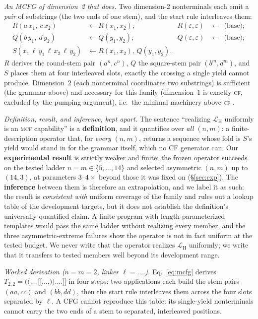 \documentclass[11pt]{article}
\newcommand{\CF}{\textsc{cf}}
\newcommand{\MCF}{\textsc{mcf}}
\begin{document}
\smallskip\noindent\emph{An MCFG of dimension~2 that does.} Two dimension-2 nonterminals each emit a
\emph{pair} of substrings (the two ends of one stem), and the start rule interleaves them:
\begin{align}\label{eq:mcfg}
  R(a\,x_1,\ c\,x_2) &\leftarrow R(x_1,x_2); &  R(\varepsilon,\varepsilon) &\leftarrow \ \ \text{(base)};
  \nonumber\\
  Q(b\,y_1,\ d\,y_2) &\leftarrow Q(y_1,y_2); &  Q(\varepsilon,\varepsilon) &\leftarrow \ \ \text{(base)};\\
  S(x_1\,\ell\,y_1\,\ell\,x_2\,\ell\,y_2) &\leftarrow R(x_1,x_2),\,Q(y_1,y_2). && \nonumber
\end{align}
$R$ derives the round-stem pair $(a^n,c^n)$, $Q$ the square-stem pair $(b^m,d^m)$, and $S$ places them at four
interleaved slots, exactly the crossing a single yield cannot produce. Dimension~$2$ (each nonterminal
coordinates two substrings) is sufficient (the grammar above) and necessary for this family (dimension~$1$ is
exactly \CF, excluded by the pumping argument), i.e.\ the minimal machinery above
\CF{} \citep{seki1991mcfg,katosekikasami2006}.

\smallskip\noindent\emph{Definition, result, and inference, kept apart.} The sentence ``realizing
$\mathcal L_{\mathrm H}$ uniformly is an \MCF{} capability'' is a \textbf{definition}, and it quantifies over
\emph{all} $(n,m)$: a finite-description operator that, for \emph{every} $(n,m)$, returns a sequence whose fold
is $S$'s yield would stand in for the grammar itself, which no CF generator can. Our \textbf{experimental
result} is strictly weaker and finite: the frozen operator succeeds on the tested ladder
$n{=}m\in\{5,\dots,14\}$ and selected asymmetric $(n,m)$ up to $(14,3)$, at parameters $3$--$4\times$ beyond
those it was fixed on (\S\ref{sec:exp}). The \textbf{inference} between them is therefore an extrapolation, and
we label it as such: the result is \emph{consistent with} uniform coverage of the family and rules out a
lookup table of the development targets, but it does not establish the definition's universally quantified
claim. A finite program with length-parameterized templates would pass the same ladder without realizing every
member, and the three asymmetric-extreme failures show the operator is not in fact uniform at the tested
budget. We never write that the operator realizes $\mathcal L_{\mathrm H}$ uniformly; we write that it
transfers to tested members well beyond its development range.

\smallskip\noindent\emph{Worked derivation ($n{=}m{=}2$, linker $\ell{=}\texttt{....}$).} Eq.~\eqref{eq:mcfg}
derives $T_{2,2}=\texttt{((....[[....))....]]}$ in four steps: two applications each
build the stem pairs $(aa,cc)$ and $(bb,dd)$, then the start rule interleaves them across the four slots
separated by $\ell$. A CFG cannot reproduce this table: its single-yield nonterminals cannot carry the two
ends of a stem to separated, interleaved positions.
\end{document}
